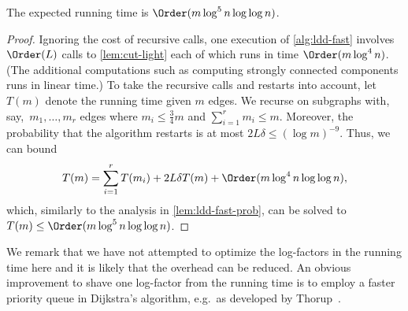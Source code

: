 \begin{lemma} \label{lem:ldd-fast-time}
The expected running time is $\Order(m \log^5 n \log\log n)$.
\end{lemma}
\begin{proof}
Ignoring the cost of recursive calls, one execution of \cref{alg:ldd-fast} involves $\Order(L)$ calls to \cref{lem:cut-light} each of which runs in time $\Order(m \log^4 n)$. (The additional computations such as computing strongly connected components runs in linear time.) To take the recursive calls and restarts into account, let~$T(m)$ denote the running time given $m$ edges. We recurse on subgraphs with, say,~$m_1, \dots, m_r$ edges where $m_i \leq \frac34 m$ and $\sum_{i=1}^r m_i \leq m$. Moreover, the probability that the algorithm restarts is at most $2L \delta \leq (\log m)^{-9}$. Thus, we can bound
\begin{equation*}
    T(m) = \sum_{i=1}^r T(m_i) + 2L\delta T(m) + \Order(m \log^4 n \log\log n),
\end{equation*}
which, similarly to the analysis in \cref{lem:ldd-fast-prob}, can be solved to $T(m) \leq \Order(m \log^5 n \log\log n)$.
\end{proof}

We remark that we have not attempted to optimize the log-factors in the running time here and it is likely that the overhead can be reduced. An obvious improvement to shave one log-factor from the running time is to employ a faster priority queue in Dijkstra's algorithm, e.g.\ as developed by Thorup~\cite{Thorup03}.